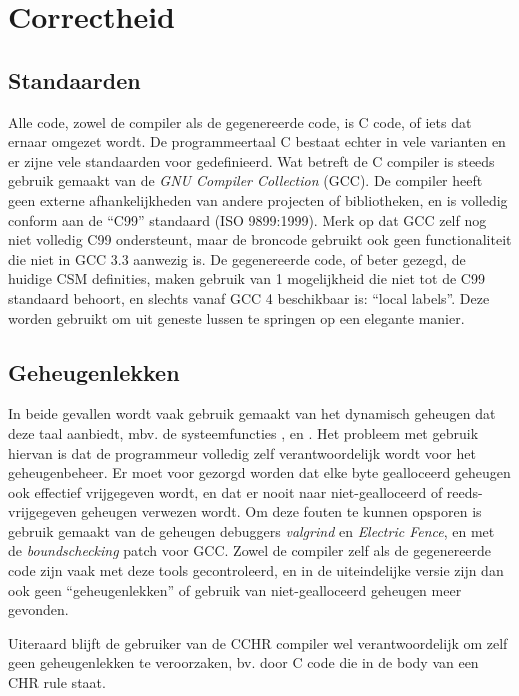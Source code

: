 \section{Correctheid} \label{sec:correctheid}

\subsection{Standaarden} \label{sec:standards}

Alle code, zowel de compiler als de gegenereerde code, is C code, of iets dat ernaar omgezet wordt. De programmeertaal C bestaat echter in vele varianten en er zijne vele standaarden voor gedefinieerd. Wat betreft de C compiler is steeds gebruik gemaakt van de {\em GNU Compiler Collection} (GCC). De compiler heeft geen externe afhankelijkheden van andere projecten of bibliotheken, en is volledig conform aan de ``C99'' standaard (ISO 9899:1999). Merk op dat GCC zelf nog niet volledig C99 ondersteunt, maar de broncode gebruikt ook geen functionaliteit die niet in GCC 3.3 aanwezig is. De gegenereerde code, of beter gezegd, de huidige CSM definities, maken gebruik van 1 mogelijkheid die niet tot de C99 standaard behoort, en slechts vanaf GCC 4 beschikbaar is: ``local labels''. Deze worden gebruikt om uit geneste lussen te springen op een elegante manier.

\subsection{Geheugenlekken} \label{sec:memleaks}


In beide gevallen wordt vaak gebruik gemaakt van het dynamisch geheugen dat deze taal aanbiedt, mbv. de systeemfuncties ,  en . Het probleem met gebruik hiervan is dat de programmeur volledig zelf verantwoordelijk wordt voor het geheugenbeheer. Er moet voor gezorgd worden dat elke byte gealloceerd geheugen ook effectief vrijgegeven wordt, en dat er nooit naar niet-gealloceerd of reeds-vrijgegeven geheugen verwezen wordt. Om deze fouten te kunnen opsporen is gebruik gemaakt van de geheugen debuggers {\em valgrind} en {\em Electric Fence}, en met de  {\em boundschecking} patch voor GCC. Zowel de compiler zelf als de gegenereerde code zijn vaak met deze tools gecontroleerd, en in de uiteindelijke versie zijn dan ook geen ``geheugenlekken'' of gebruik van niet-gealloceerd geheugen meer gevonden.

Uiteraard blijft de gebruiker van de CCHR compiler wel verantwoordelijk om zelf geen geheugenlekken te veroorzaken, bv. door C code die in de body van een CHR rule staat.
